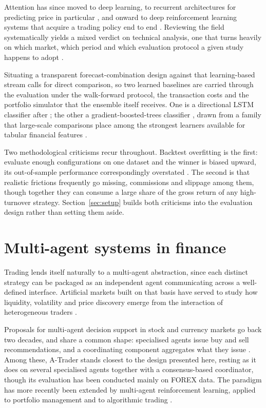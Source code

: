 Attention has since moved to deep learning, to recurrent architectures for predicting price in particular \cite{fischerkrauss2018}, and onward to deep reinforcement learning systems that acquire a trading policy end to end \cite{huang2022,shavandi2022,hambly2023,anders2024empirical}. Reviewing the field systematically yields a mixed verdict on technical analysis, one that turns heavily on which market, which period and which evaluation protocol a given study happens to adopt \cite{nti2020,kruczkowski2026review}.

Situating a transparent forecast-combination design against that learning-based stream calls for direct comparison, so two learned baselines are carried through the evaluation under the walk-forward protocol, the transaction costs and the portfolio simulator that the ensemble itself receives. One is a directional LSTM classifier after \cite{fischerkrauss2018}; the other a gradient-boosted-trees classifier \cite{friedman2001,ke2017lightgbm}, drawn from a family that large-scale comparisons place among the strongest learners available for tabular financial features \cite{krauss2017,gukellyxiu2020}.

Two methodological criticisms recur throughout. Backtest overfitting is the first: evaluate enough configurations on one dataset and the winner is biased upward, its out-of-sample performance correspondingly overstated \cite{bailey2014,harvey2016}. The second is that realistic frictions frequently go missing, commissions and slippage among them, though together they can consume a large share of the gross return of any high-turnover strategy. Section~\ref{sec:setup} builds both criticisms into the evaluation design rather than setting them aside.

\section{Multi-agent systems in finance}\label{sec:sota_mas}

Trading lends itself naturally to a multi-agent abstraction, since each distinct strategy can be packaged as an independent agent communicating across a well-defined interface. Artificial markets built on that basis have served to study how liquidity, volatility and price discovery emerge from the interaction of heterogeneous traders \cite{lebaron2011,8675280}.

Proposals for multi-agent decision support in stock and currency markets go back two decades, and share a common shape: specialised agents issue buy and sell recommendations, and a coordinating component aggregates what they issue \cite{luo2002,korczak2013,hernes2016,hernes2024}. Among these, A-Trader \cite{korczak2013,hernes2016} stands closest to the design presented here, resting as it does on several specialised agents together with a consensus-based coordinator, though its evaluation has been conducted mainly on FOREX data. The paradigm has more recently been extended by multi-agent reinforcement learning, applied to portfolio management \cite{huang2022} and to algorithmic trading \cite{shavandi2022}.

